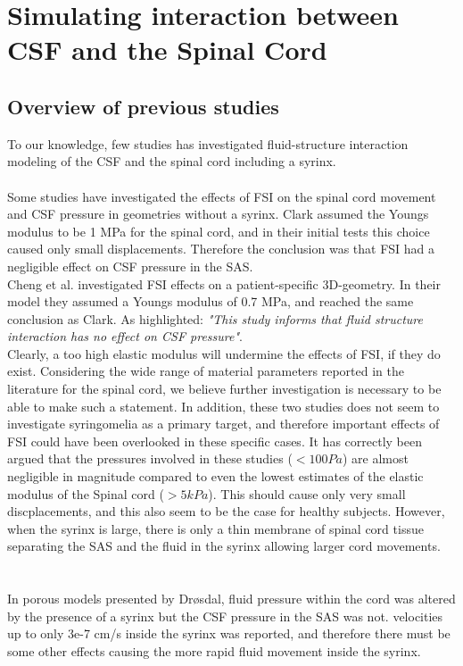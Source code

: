\chapter{Simulating interaction between CSF and the Spinal Cord}
\section{Overview of previous studies}
To our knowledge, few studies has investigated fluid-structure interaction modeling of the CSF and the spinal cord including a syrinx. 
\\
\\
Some studies have investigated the effects of FSI on the spinal cord movement and CSF pressure in geometries without a syrinx. Clark \cite{Clar13} assumed the Youngs modulus to be 1 MPa for the spinal cord, and in their initial tests this choice caused only small displacements. Therefore the conclusion was that FSI had a negligible effect on CSF pressure in the SAS. \\
Cheng et al. \cite{Chen14} investigated FSI effects on a patient-specific 3D-geometry. In their model they assumed a Youngs modulus of 0.7 MPa, and reached the same conclusion as Clark. As highlighted: \textit{"This study informs that fluid structure interaction has no effect on CSF pressure"}. 
\\ Clearly, a too high elastic modulus will undermine the effects of FSI, if they do exist. Considering the wide range of material parameters reported in the literature for the spinal cord, we believe further investigation is necessary to be able to make such a statement. In addition, these two studies does not seem to investigate syringomelia as a primary target, and therefore important effects of FSI could have been overlooked in these specific cases. It has correctly been argued that the pressures involved in these studies ($<100 Pa$) are almost negligible in magnitude compared to even the lowest estimates of the elastic modulus of the Spinal cord ($>5kPa$). This should cause only very small discplacements, and this also seem to be the case for healthy subjects. However, when the syrinx is large, there is only a thin membrane of spinal cord tissue separating the SAS and the fluid in the syrinx allowing larger cord movements.  \\
\\
\\
In porous models presented by Dr{\o}sdal, \cite{Dros11} fluid pressure within the cord was altered by the presence of a syrinx but the CSF pressure in the SAS was not. velocities up to only 3e-7 cm/s inside the syrinx was reported, and therefore there must be some other effects causing the more rapid fluid movement inside the syrinx.  
